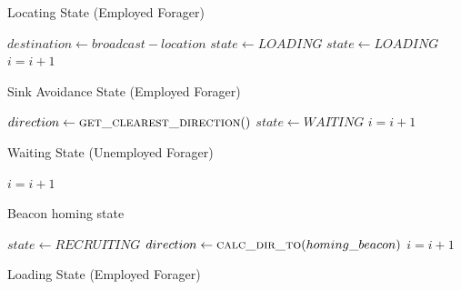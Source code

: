 \begin{algorithm}
\caption{Locating State (Employed Forager)}
\label{algorithm:employedforager:locating}
\begin{algorithmic}[1]
		\State $destination \gets broadcast - location$
	\EndIf
	\State {}
	\State {}
		\State $state \gets LOADING$
		\State $state \gets LOADING$
	\EndIf
	\State $i =i + 1$
\EndFunction
\end{algorithmic}
\end{algorithm}

\begin{algorithm}
\caption{Sink Avoidance State (Employed Forager)}
\label{algorithm:sinkavoidance}
\begin{algorithmic}[1]
	\State $direction \gets \Call{get\_clearest\_direction}{ }$ 
	\State {}
\Else
	\State $state \gets WAITING$
\EndIf
\State $i =i + 1$
\EndFunction
\end{algorithmic}
\end{algorithm}
\begin{algorithm}
\caption{Waiting State (Unemployed Forager)}
\label{algorithm:unemployedforager:locating}
\begin{algorithmic}[1]
	\State {} 
 
\Else
	\State {}
\EndIf
\State $i =i + 1$
\EndFunction
\end{algorithmic}
\end{algorithm}

\begin{algorithm}
\caption{Beacon homing state}
\label{algorithm:beaconhoming}
\begin{algorithmic}[1]
	\State $state \gets RECRUITING$
\EndIf
\State $direction \gets \Call{calc\_dir\_to}{homing\_beacon}$
\State {}
\State $i =i + 1$
\EndFunction
\end{algorithmic}
\end{algorithm}

\begin{algorithm}
\caption{Loading State (Employed Forager)}
\label{algorithm:loading}
\begin{algorithmic}[1]
	\State {}
\Else
\EndIf
\EndFunction
\end{algorithmic}
\end{algorithm}

